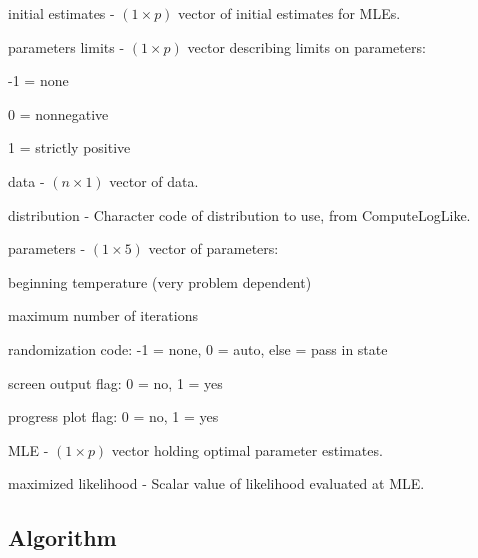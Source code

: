 \documentclass{book}
\newcommand{\textcode}[1]{\textsf{\small #1}}   %
\begin{document}
\begin{compactitem}

\item \textcode{initial estimates} - $\left( 1 \times p \right)$ vector of initial estimates for MLEs.

\item \textcode{parameters limits} - $\left( 1 \times p \right)$ vector describing limits on parameters:
\begin{compactitem}
\item -1 = none
\item 0 = nonnegative
\item 1 = strictly positive
\end{compactitem}

\item \textcode{data} - $\left( n \times 1 \right)$ vector of
data.

\item \textcode{distribution} - Character code of distribution
to use, from \textcode{ComputeLogLike}.

\item \textcode{parameters} - $\left( 1 \times 5 \right)$ vector
of parameters:
\begin{compactenum}
\item beginning temperature (very problem dependent)
\item maximum number of iterations
\item randomization code: -1 = none, 0 = auto, else = pass in
state
\item screen output flag: 0 = no, 1 = yes
\item progress plot flag: 0 = no, 1 = yes
\end{compactenum}

\item \textcode{MLE} - $\left( 1 \times p \right)$ vector holding optimal parameter estimates.

\item \textcode{maximized likelihood} - Scalar value of likelihood evaluated at \textcode{MLE}.

\end{compactitem}

\subsection*{Algorithm}
\end{document}
